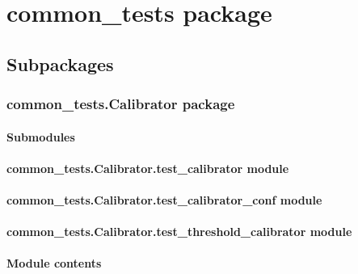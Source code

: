 \documentclass[letterpaper,10pt,english]{sphinxmanual}
\begin{document}
\chapter{common\_tests package}
\label{\detokenize{common_tests:common-tests-package}}\label{\detokenize{common_tests::doc}}

\section{Subpackages}
\label{\detokenize{common_tests:subpackages}}

\subsection{common\_tests.Calibrator package}
\label{\detokenize{common_tests.Calibrator:common-tests-calibrator-package}}\label{\detokenize{common_tests.Calibrator::doc}}

\subsubsection{Submodules}
\label{\detokenize{common_tests.Calibrator:submodules}}

\subsubsection{common\_tests.Calibrator.test\_calibrator module}
\label{\detokenize{common_tests.Calibrator:common-tests-calibrator-test-calibrator-module}}

\subsubsection{common\_tests.Calibrator.test\_calibrator\_conf module}
\label{\detokenize{common_tests.Calibrator:common-tests-calibrator-test-calibrator-conf-module}}

\subsubsection{common\_tests.Calibrator.test\_threshold\_calibrator module}
\label{\detokenize{common_tests.Calibrator:common-tests-calibrator-test-threshold-calibrator-module}}

\subsubsection{Module contents}
\label{\detokenize{common_tests.Calibrator:module-common_tests.Calibrator}}\label{\detokenize{common_tests.Calibrator:module-contents}}
\end{document}
